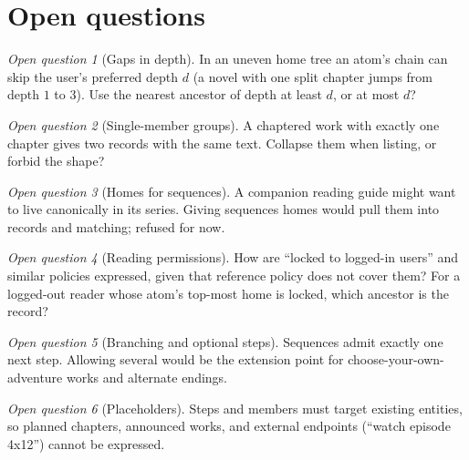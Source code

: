 \documentclass{amsart}
\theoremstyle{remark}
\newtheorem{oq}{Open question}
\begin{document}
\section{Open questions}
\begin{oq}[Gaps in depth]In an uneven home tree an atom's chain can skip the user's preferred depth $d$ (a novel with one split chapter jumps from depth $1$ to $3$). Use the nearest ancestor of depth at least $d$, or at most $d$?\end{oq}
\begin{oq}[Single-member groups]A chaptered work with exactly one chapter gives two records with the same text. Collapse them when listing, or forbid the shape?\end{oq}
\begin{oq}[Homes for sequences]A companion reading guide might want to live canonically in its series. Giving sequences homes would pull them into records and matching; refused for now.\end{oq}
\begin{oq}[Reading permissions]How are ``locked to logged-in users'' and similar policies expressed, given that reference policy does not cover them? For a logged-out reader whose atom's top-most home is locked, which ancestor is the record?\end{oq}
\begin{oq}[Branching and optional steps]Sequences admit exactly one next step. Allowing several would be the extension point for choose-your-own-adventure works and alternate endings.\end{oq}
\begin{oq}[Placeholders]Steps and members must target existing entities, so planned chapters, announced works, and external endpoints (``watch episode 4x12'') cannot be expressed.\end{oq}
\end{document}
